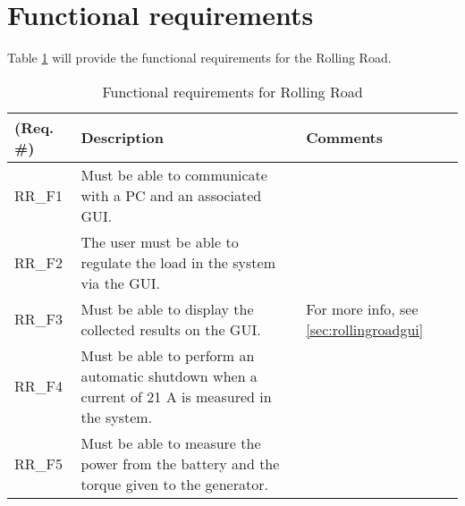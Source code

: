 \section{Functional requirements}
Table \ref{Functional:Rolling Road} will provide the functional requirements for the Rolling Road.

\begin{table}[h!]
	\centering
	\begin{tabular}{|p{2 cm}|p{7 cm}|p{4 cm}|}
	\hline
	\textbf{(Req. \#)} & \textbf{Description} & \textbf{Comments} \\\hline
	RR\_F1	& Must be able to communicate with a PC and an associated GUI. &   \\\hline
	RR\_F2	& The user must be able to regulate the load in the system via the GUI. &   \\\hline
	RR\_F3	& Must be able to display the collected results on the GUI. & For more info, see \ref{sec:rollingroadgui}  \\\hline
	RR\_F4	& Must be able to perform an automatic shutdown when a current of 21 A is measured in the system. &   \\\hline
	RR\_F5	& Must be able to measure the power from the battery and the torque given to the generator. &   \\\hline
	\end{tabular}
	\label{Functional:Rolling Road}
	\caption{Functional requirements for Rolling Road}
\end{table}